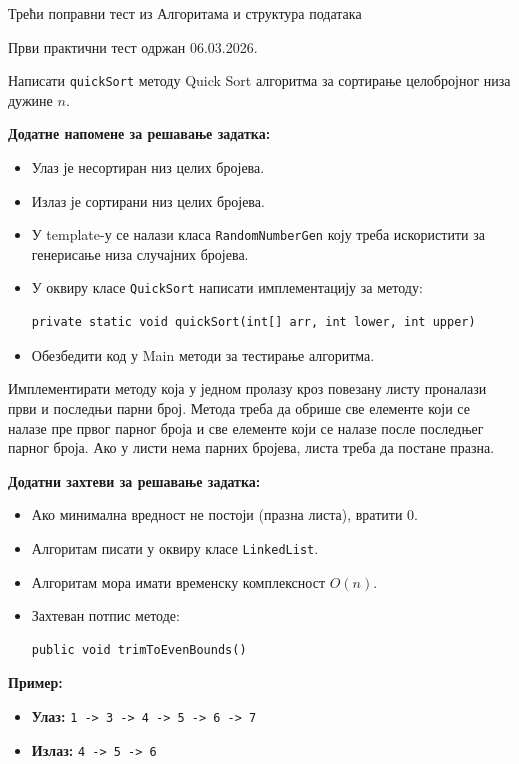 
Трећи поправни тест из Алгоритама и структура података

Први практични тест одржан 06.03.2026.

Написати \texttt{quickSort} методу Quick Sort алгоритма за сортирање целобројног низа дужине $n$.

\textbf{Додатне напомене за решавање задатка:}
\begin{itemize}
	\item Улаз је несортиран низ целих бројева.
	\item Излаз је сортирани низ целих бројева.
	\item У template-у се налази класа \texttt{RandomNumberGen} коју треба искористити за генерисање низа случајних бројева.
	\item У оквиру класе \texttt{QuickSort} написати имплементацију за методу:
	\begin{Verbatim}[fontsize=\small]
private static void quickSort(int[] arr, int lower, int upper)
	\end{Verbatim}
	\item Обезбедити код у Main методи за тестирање алгоритма.
\end{itemize}

Имплементирати методу која у једном пролазу кроз повезану листу проналази први и последњи парни број. Метода треба да обрише све елементе који се налазе пре првог парног броја и све елементе који се налазе после последњег парног броја. Ако у листи нема парних бројева, листа треба да постане празна.

\textbf{Додатни захтеви за решавање задатка:}
\begin{itemize}
	\item Ако минимална вредност не постоји (празна листа), вратити 0.
	\item Алгоритам писати у оквиру класе \texttt{LinkedList}.
	\item Алгоритам мора имати временску комплексност $O(n)$.
	\item Захтеван потпис методе:
	\begin{Verbatim}[fontsize=\small]
public void trimToEvenBounds()
	\end{Verbatim}
\end{itemize}

\textbf{Пример:}
\begin{itemize}
	\item \textbf{Улаз:} \texttt{1 -> 3 -> 4 -> 5 -> 6 -> 7}
	\item \textbf{Излаз:} \texttt{4 -> 5 -> 6}
\end{itemize}

